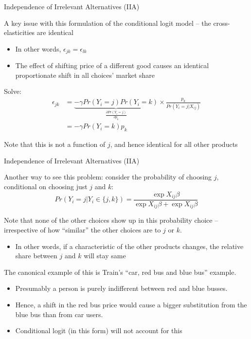 \documentclass[notes,11pt, aspectratio=169]{beamer}
\newenvironment{wideitemize}{\itemize\addtolength{\itemsep}{10pt}}{\enditemize}
\begin{document}
\begin{frame}{Independence of Irrelevant Alternatives (IIA)}
  \begin{wideitemize}
  \item A key issue with this formulation of the conditional logit
    model -- the cross-elasticities are identical
    \begin{itemize}
    \item In other words, $\epsilon_{jk} = \epsilon_{lk}$
    \item The effect of shifting price of a different good causes an
      identical proportionate shift in all choices' market share
    \end{itemize}
  \item   Solve:
    \begin{align*}
      \epsilon_{jk} &= \underbrace{-\gamma Pr(Y_{i} = j )Pr(Y_{i} = k )}_{\frac{\partial Pr(Y_{i} = j)}{\partial p_{k}}} \times \frac{p_{k}}{Pr(Y_{i} = j | X_{ij})}\\
                    &= -\gamma Pr(Y_{i} = k )p_{k}
    \end{align*}
    \item Note that this is not a function of $j$, and hence identical for
    all other products
  \end{wideitemize}
  
\end{frame}

\begin{frame}{Independence of Irrelevant Alternatives (IIA)}
  \begin{wideitemize}
  \item Another way to see this problem: consider the probability of
    choosing $j$, conditional on choosing just $j$ and $k$:
    $$Pr(Y_{i} = j | Y_{i} \in \{j,k\}) = \frac{\exp{X_{ij}\beta}}{\exp{X_{ij}\beta} + \exp{X_{ij}\beta}} $$
  \item Note that none of the other choices show up in this
    probability choice -- irrespective of how ``similar'' the other
    choices are to $j$ or $k$.
    \begin{itemize}
    \item In other words, if a characteristic of the other products changes,
      the relative share between $j$ and $k$ will stay same
    \end{itemize}
  \item The canonical example of this is Train's ``car, red bus and
    blue bus'' example.
    \begin{itemize}
    \item  Presumably a person is purely indifferent
      between red and blue busses.
    \item Hence, a shift in the red bus price would cause a bigger substitution from the blue bus than from car
      users.
    \item Conditional logit (in this form) will not account for this
    \end{itemize}
  \end{wideitemize}
\end{frame}
\end{document}
